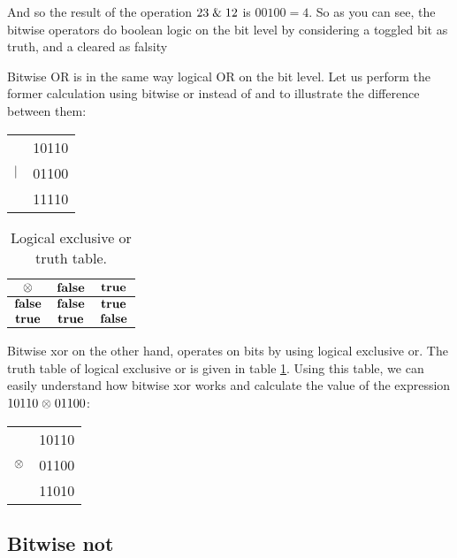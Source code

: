 And so the result of the operation $23 \mathrel{\&} 12$ is $00100=4$. So as
you can see, the bitwise operators do boolean logic on the bit level
by considering a toggled bit as truth, and a cleared as falsity

Bitwise OR is in the same way logical OR on the bit level. Let us
perform the former calculation using bitwise or instead of and to
illustrate the difference between them:

\begin{center}
  \begin{tabular}{lr}
    & 10110  \\
    $\mathrel{|}$ & 01100 \\
    \hline
    & 11110 \\
  \end{tabular}
\end{center}

\begin{table}
  \centering
  \begin{tabular}{|c|c|c|}
    \hline
    $\mathbf{\mathrel{\otimes}}$ & $\mathbf{\textbf{false}}$ & $\mathbf{\textbf{true}}$ \\ \hline
    $\mathbf{\textbf{false}}$ & $\mathbf{\textbf{false}}$ & $\mathbf{\textbf{true}}$ \\ \hline
    $\mathbf{\textbf{true}}$ & $\mathbf{\textbf{true}}$ & $\mathbf{\textbf{false}}$ \\ \hline
  \end{tabular}
  \caption{Logical exclusive or truth table.}
  \label{tab:log-exlusive-or-table}
\end{table}

Bitwise xor on the other hand, operates on bits by using logical
exclusive or. The truth table of logical exclusive or is given in
table \ref{tab:log-exlusive-or-table}. Using this table, we can easily
understand how bitwise xor works and calculate the value of the
expression $10110 \mathrel{\otimes} 01100$:

\begin{center}
  \begin{tabular}{lr}
    & 10110  \\
    $\mathrel{\otimes}$ & 01100 \\
    \hline
    & 11010 \\
  \end{tabular}
\end{center}

\subsection{Bitwise not}

